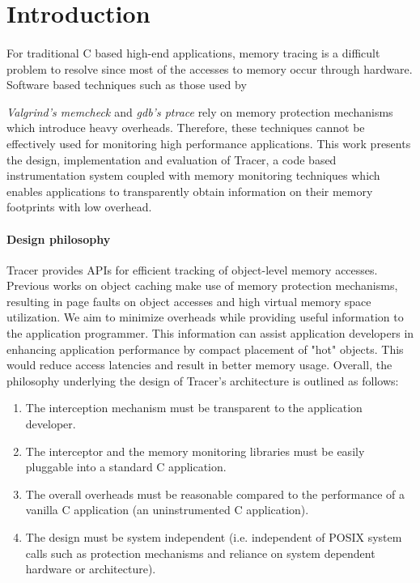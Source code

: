\section{Introduction} 
\label{sec:intro}
\paragraph{}
For traditional C based high-end applications, memory tracing is a difficult problem to resolve since most of the accesses to memory occur through hardware. Software based techniques such as those used by {\emph{Valgrind's memcheck \cite{nethercote2007valgrind}} and {\emph{gdb's ptrace}} \cite{gdb} rely on memory protection mechanisms which introduce heavy overheads. Therefore, these techniques cannot be effectively used for monitoring high performance applications. This work presents the design, implementation and evaluation of Tracer, a code based instrumentation system coupled with memory monitoring techniques which enables applications to transparently obtain information on their memory footprints with low overhead. 

\paragraph{Design philosophy}
Tracer provides APIs for efficient tracking of object-level memory accesses. Previous works on object caching make use of memory protection mechanisms, resulting in page faults on object accesses and high virtual memory space utilization. We aim to minimize overheads while providing useful information to the application programmer. This information can assist application developers in enhancing application performance by compact placement of "hot" objects. This would reduce access latencies and result in better memory usage. Overall, the philosophy underlying the design of Tracer's architecture is outlined as follows:
\begin{enumerate}
\item The interception mechanism must be transparent to the application developer.
\item The interceptor and the memory monitoring libraries must be easily pluggable into a standard C application.
\item The overall overheads must be reasonable compared to the performance of a vanilla C application (an uninstrumented C application).
\item The design must be system independent (i.e. independent of POSIX system calls such as protection mechanisms and reliance on system dependent hardware or architecture).
\end{enumerate}

}
